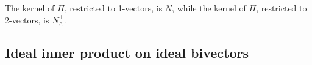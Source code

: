 \documentclass{birkjour}
\newcommand{\mydogblue}{{\color{gray} $\square$~~}}
\begin{document}
 \myexercise  The kernel of $\Pi$, restricted to 1-vectors, is $N$, while the kernel of $\Pi$, restricted to 2-vectors, is $N_{\wedge}^{\perp}$. %

\subsection{Ideal inner product on ideal bivectors}
\end{document}
